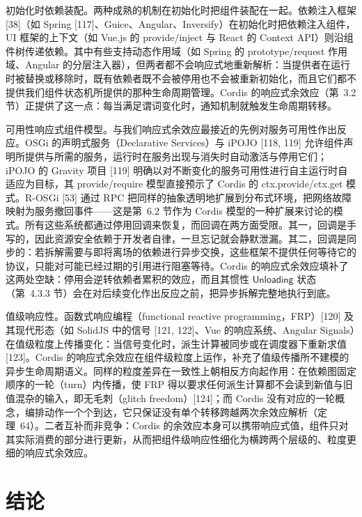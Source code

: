 \documentclass[
  10
]{article}
\begin{document}
初始化时依赖装配。两种成熟的机制在初始化时把组件装配在一起。依赖注入框架 {[}38{]}（如 Spring {[}117{]}、Guice、Angular、Inversify）在初始化时把依赖注入组件，UI 框架的上下文（如 Vue.js 的 provide/inject 与 React 的 Context API）则沿组件树传递依赖。其中有些支持动态作用域（如 Spring 的 prototype/request 作用域、Angular 的分层注入器），但两者都不会响应式地重新解析：当提供者在运行时被替换或移除时，既有依赖者既不会被停用也不会被重新初始化，而且它们都不提供我们组件状态机所提供的那种生命周期管理。Cordis 的响应式余效应（第~3.2 节）正提供了这一点：每当满足谓词变化时，通知机制就触发生命周期转移。

可用性响应式组件模型。与我们响应式余效应最接近的先例对服务可用性作出反应。OSGi 的声明式服务（Declarative Services）与 iPOJO {[}118, 119{]} 允许组件声明所提供与所需的服务，运行时在服务出现与消失时自动激活与停用它们；iPOJO 的 Gravity 项目 {[}119{]} 明确以对不断变化的服务可用性进行自主运行时自适应为目标，其 provide/require 模型直接预示了 Cordis 的 ctx.provide/ctx.get 模式。R-OSGi {[}53{]} 通过 RPC 把同样的抽象透明地扩展到分布式环境，把网络故障映射为服务撤回事件——这是第~6.2 节作为 Cordis 模型的一种扩展来讨论的模式。所有这些系统都通过停用回调来恢复，而回调在两方面受限。其一，回调是手写的，因此资源安全依赖于开发者自律，一旦忘记就会静默泄漏。其二，回调是同步的：若拆解需要与即将离场的依赖进行异步交换，这些框架不提供任何等待它的协议，只能对可能已经过期的引用进行阻塞等待。Cordis 的响应式余效应填补了这两处空缺：停用会逆转依赖者累积的效应，而且其惯性 \(\mathsf{Unloading}\) 状态（第~4.3.3 节）会在对后续变化作出反应之前，把异步拆解完整地执行到底。

值级响应性。函数式响应编程（functional reactive programming，FRP）{[}120{]} 及其现代形态（如 SolidJS 中的信号 {[}121, 122{]}、Vue 的响应系统、Angular Signals）在值级粒度上传播变化：当信号变化时，派生计算被同步或在调度器下重新求值 {[}123{]}。Cordis 的响应式余效应在组件级粒度上运作，补充了值级传播所不建模的异步生命周期语义。同样的粒度差异在一致性上朝相反方向起作用：在依赖图固定顺序的一轮（turn）内传播，使 FRP 得以要求任何派生计算都不会读到新值与旧值混杂的输入，即无毛刺（glitch freedom）{[}124{]}；而 Cordis 没有对应的一轮概念，编排动作一个个到达，它只保证没有单个转移跨越两次余效应解析（定理~64）。二者互补而非竞争：Cordis 的余效应本身可以携带响应式值，组件只对其实际消费的部分进行更新，从而把组件级响应性细化为横跨两个层级的、粒度更细的响应式余效应。
\section{结论} \label{conclusion}
\end{document}
